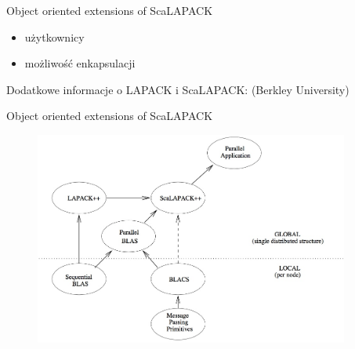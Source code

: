 	\begin{frame}{Object oriented extensions of ScaLAPACK}
		\begin{itemize}
			\item użytkownicy
			\item możliwość enkapsulacji
		\end{itemize}
		Dodatkowe informacje o LAPACK i ScaLAPACK: (Berkley University)
	\end{frame}
	\begin{frame}{Object oriented extensions of ScaLAPACK}
		\begin{figure}
			\includegraphics[height=7cm]{img/13/scalapackextensions}
		\end{figure}
	\end{frame}